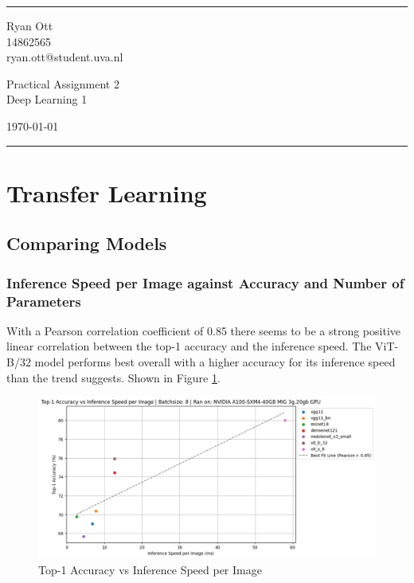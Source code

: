 \documentclass[a4paper]{article}
\begin{document}

\fancyhead[C]{}
\hrule \medskip %
\begin{minipage}{0.295\linewidth} 
\raggedright
\footnotesize
Ryan Ott \hfill\\   
14862565 \hfill\\
ryan.ott@student.uva.nl
\end{minipage}
\begin{minipage}{0.4\linewidth} 
\centering 
\large 
Practical Assignment 2\\ 
\normalsize 
Deep Learning 1\\ 
\end{minipage}
\begin{minipage}{0.295\linewidth} 
\raggedleft
\today\hfill\\
\end{minipage}
\medskip\hrule 
\bigskip


\section{Transfer Learning}
\subsection{Comparing Models}
\subsubsection{Inference Speed per Image against Accuracy and Number of Parameters}
With a Pearson correlation coefficient of 0.85 there seems to be a strong positive linear correlation between the
top-1 accuracy and the inference speed. The ViT-B/32 model performs best overall with a higher accuracy for its
inference speed than the trend suggests. Shown in Figure \ref{fig:Top1Acc-vs-Inference}.
\begin{figure}[h]
    \centering
    \includegraphics[width=0.75\linewidth]{"imgs/Top1Acc-vs-Inference.png"}
    \caption{Top-1 Accuracy vs Inference Speed per Image}
    \label{fig:Top1Acc-vs-Inference}
\end{figure}
\end{document}
